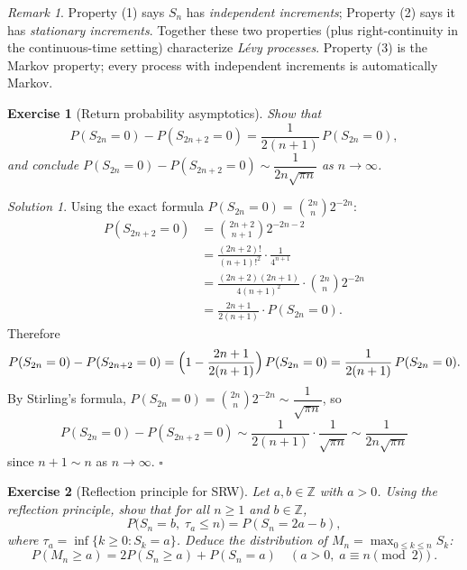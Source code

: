 \documentclass[12pt]{article}
\newtheorem{exercise}{Exercise}
\theoremstyle{remark}
\newtheorem*{solution}{Solution}
\newtheorem*{remark}{Remark}
\begin{document}
\begin{remark}
Property (1) says $S_n$ has \emph{independent increments}; Property (2) says it has
\emph{stationary increments}.  Together these two properties (plus right-continuity in the
continuous-time setting) characterize \emph{Lévy processes}.  Property (3) is the Markov
property; every process with independent increments is automatically Markov.
\end{remark}

\begin{exercise}[Return probability asymptotics]
\label{ex:return}
Show that
\[
  P(S_{2n}=0) - P(S_{2n+2}=0) = \frac{1}{2(n+1)}\,P(S_{2n}=0),
\]
and conclude $P(S_{2n}=0) - P(S_{2n+2}=0) \sim \dfrac{1}{2n\sqrt{\pi n}}$ as $n\to\infty$.
\end{exercise}

\begin{solution}
Using the exact formula $P(S_{2n}=0) = \binom{2n}{n}2^{-2n}$:
\begin{align*}
  P(S_{2n+2}=0) &= \binom{2n+2}{n+1}2^{-2n-2} \\
  &= \frac{(2n+2)!}{(n+1)!^2} \cdot \frac{1}{4^{n+1}} \\
  &= \frac{(2n+2)(2n+1)}{4(n+1)^2} \cdot \binom{2n}{n} 2^{-2n} \\
  &= \frac{2n+1}{2(n+1)} \cdot P(S_{2n}=0).
\end{align*}
Therefore
\[
  P(S_{2n}=0) - P(S_{2n+2}=0)
  = \Bigl(1 - \frac{2n+1}{2(n+1)}\Bigr)\,P(S_{2n}=0)
  = \frac{1}{2(n+1)}\,P(S_{2n}=0).
\]
By Stirling's formula, $P(S_{2n}=0) = \binom{2n}{n}2^{-2n} \sim \dfrac{1}{\sqrt{\pi n}}$, so
\[
  P(S_{2n}=0) - P(S_{2n+2}=0)
  \sim \frac{1}{2(n+1)} \cdot \frac{1}{\sqrt{\pi n}}
  \sim \frac{1}{2n\sqrt{\pi n}}
\]
since $n+1 \sim n$ as $n\to\infty$. \hfill$\square$
\end{solution}

\begin{exercise}[Reflection principle for SRW]
Let $a, b \in \mathbb{Z}$ with $a > 0$. Using the reflection principle, show that for all
$n \ge 1$ and $b \in \mathbb{Z}$,
\[
  P\!\bigl(S_n = b,\; \tau_a \le n\bigr) = P(S_n = 2a - b),
\]
where $\tau_a = \inf\{k \ge 0: S_k = a\}$.  Deduce the distribution of
$M_n = \max_{0 \le k \le n} S_k$:
\[
  P(M_n \ge a) = 2P(S_n \ge a) + P(S_n = a) \quad (a > 0,\; a \equiv n \pmod{2}).
\]
\end{exercise}
\end{document}
